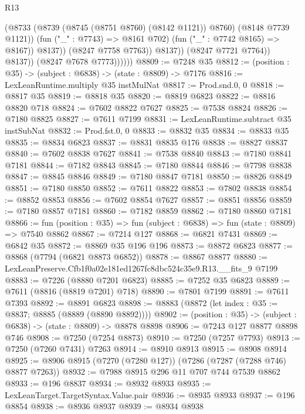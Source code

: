 \begin{lexlean}{R13}
\begin{coremodule}
                                (@8733
                                  (@8739 (@8745 (@8751 @8760) (@8142 @1121)) @8760)
                                  (@8148 @7739 @1121))
                                (fun ("_" : @7743) => @8161 @702)
                                (fun ("_" : @7742 @8165) => @8167))
                              @8137))
                          (@8247 @7758 @7763))
                        @8137))
                    (@8247 @7721 @7764))
                  @8137))
              (@8247 @7678 @7773))))))
@8809 := @7248 @35
@8812 := (position : @35) -> (subject : @6838) -> (state : @8809) -> @7176
@8816 := LexLeanRuntime.multiply @35 instMulNat
@8817 := Prod.snd.{0, 0}
@8818 := @8817 @35
@8819 := @8818 @35
@8820 := @8819 @6823
@8822 := @8816 @8820 @718
@8824 := @7602 @8822 @7627
@8825 := @7538 @8824
@8826 := @7180 @8825
@8827 := @7611 @7199
@8831 := LexLeanRuntime.subtract @35 instSubNat
@8832 := Prod.fst.{0, 0}
@8833 := @8832 @35
@8834 := @8833 @35
@8835 := @8834 @6823
@8837 := @8831 @8835 @176
@8838 := @8827 @8837
@8840 := @7602 @8838 @7627
@8841 := @7538 @8840
@8843 := @7180 @8841 @7181
@8844 := @7182 @8843
@8845 := @7180 @8844
@8846 := @7798 @8838
@8847 := @8845 @8846
@8849 := @7180 @8847 @7181
@8850 := @8826 @8849
@8851 := @7180 @8850
@8852 := @7611 @8822
@8853 := @7802 @8838
@8854 := @8852 @8853
@8856 := @7602 @8854 @7627
@8857 := @8851 @8856
@8859 := @7180 @8857 @7181
@8860 := @7182 @8859
@8862 := @7180 @8860 @7181
@8866 := fun (position : @35) => fun (subject : @6838) => fun (state : @8809) => @7540 @8862
@8867 := @7214 @127
@8868 := @6821 @7431
@8869 := @6842 @35
@8872 := @8869 @35 @196 @196
@8873 := @8872 @6823
@8877 := @8868 (@7794 (@6821 @8873 @6852))
@8878 := @8867 @8877
@8880 := LexLeanPreserve.Cfb1f0a02e181ed1267fc8dbc524c35e9.R13.__fits_9 @7199
@8883 := @7226 (@8880 @7201 @6823)
@8885 := @7252 @35 @6823
@8889 := @7611 (@8816 (@8819 @7201) @718)
@8890 := @7801 @7199
@8891 := @7611 @7393
@8892 := @8891 @6823
@8898 := @8883 (@8872 (let index : @35 := @8837; @8885 (@8889 (@8890 @8892))))
@8902 := (position : @35) -> (subject : @6838) -> (state : @8809) -> @8878 @8898
@8906 := @7243 @127 @8877 @8898 @746
@8908 := @7250 (@7254 @8873)
@8910 := @7250 (@7257 @7793)
@8913 := @7250 (@7260 @7431) @7263
@8914 := @8910 @8913
@8915 := @8908 @8914
@8925 := @8906 @8915 (@7270 (@7280 @127)) (@7286 (@7287 (@7288 @746) @8877 @7263))
@8932 := @7988 @8915 @296 @11 @707 @744 @7539 @8862
@8933 := @196 @8837
@8934 := @8932 @8933
@8935 := LexLeanTarget.TargetSyntax.Value.pair
@8936 := @8935 @8933
@8937 := @196 @8854
@8938 := @8936 @8937
@8939 := @8934 @8938

\end{coremodule}
\end{lexlean}
